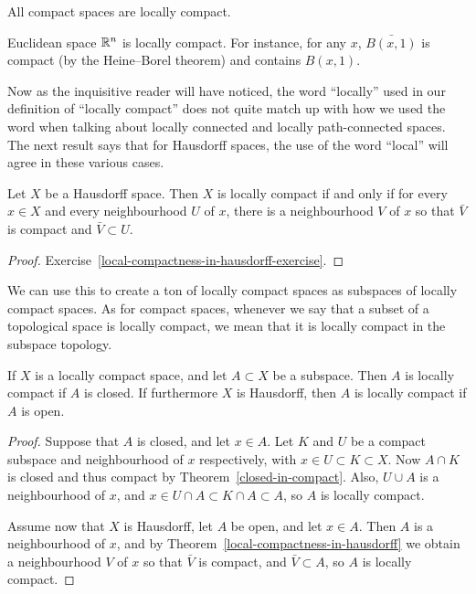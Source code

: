 \begin{example}
  All compact spaces are locally compact.
\end{example}
\begin{example}
  Euclidean space $\mathbb{R}^n$ is locally compact. For instance, for any $x$, $\bar{B(x,1)}$ is compact (by the Heine--Borel theorem) and contains $B(x,1)$.
\end{example}
Now as the inquisitive reader will have noticed, the word ``locally'' used in our definition of ``locally compact'' does not quite match up with how we used the word when talking about locally connected and locally path-connected spaces. The next result says that for Hausdorff spaces, the use of the word ``local'' will agree in these various cases.
\begin{thm}
  \label{local-compactness-in-hausdorff}
  Let $X$ be a Hausdorff space. Then $X$ is locally compact if and only if for every $x \in X$ and every neighbourhood $U$ of $x$, there is a neighbourhood $V$ of $x$ so that $\bar{V}$ is compact and $\bar V \subset U$.
\end{thm}
\begin{proof}
  Exercise~\ref{local-compactness-in-hausdorff-exercise}.
\end{proof}
We can use this to create a ton of locally compact spaces as subspaces of locally compact spaces. As for compact spaces, whenever we say that a subset of a topological space is locally compact, we mean that it is locally compact in the subspace topology.
\begin{prop}
  If $X$ is a locally compact space, and let $A \subset X$ be a subspace. Then $A$ is locally compact if $A$ is closed. If furthermore $X$ is Hausdorff, then $A$ is locally compact if $A$ is open.
\end{prop}
\begin{proof}
  Suppose that $A$ is closed, and let $x \in A$. Let $K$ and $U$ be a compact subspace and neighbourhood of $x$ respectively, with $x \in U \subset K \subset X$. Now $A \cap K$ is closed and thus compact by Theorem~\ref{closed-in-compact}. Also, $U \cup A$ is a neighbourhood of $x$, and $x \in U \cap A \subset K \cap A \subset A$, so $A$ is locally compact.
  
  Assume now that $X$ is Hausdorff, let $A$ be open, and let $x \in A$. Then $A$ is a neighbourhood of $x$, and by Theorem~\ref{local-compactness-in-hausdorff} we obtain a neighbourhood $V$ of $x$ so that $\bar{V}$ is compact, and $\bar{V} \subset A$, so $A$ is locally compact.
\end{proof}

